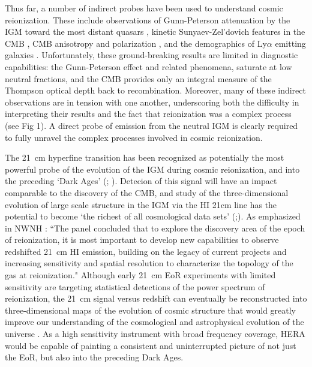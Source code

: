 \documentclass[preprint]{aastex}
\begin{document}
Thus far, a number of indirect probes have been used to understand cosmic reionization.  These include observations of Gunn-Peterson attenuation by the IGM toward the most distant quasars \citep{fan_et_al2006,bouwens_et_al2010}, kinetic
Sunyaev-Zel'dovich features in the CMB \citep{zahn_et_al2012}, CMB anisotropy and polarization \citep{page_et_al2007,planck_et_al2013}, and the demographics of Ly$\alpha$ emitting galaxies \citep{http://adsabs.harvard.edu/abs/2013arXiv1308.5985T}.  Unfortunately, these ground-breaking results are limited in diagnostic capabilities: the Gunn-Peterson effect and related phenomena, saturate at low neutral fractions, and the CMB provides only an integral measure of the Thompson optical depth back to recombination.  Moreover, many of these indirect observations are in tension with one another, underscoring both the difficulty in interpreting their results and the fact that reionization was a complex process (see Fig 1). A direct probe of emission from the neutral IGM is clearly required to fully unravel the complex processes involved in cosmic reionization. 

The 21~cm hyperfine transition has been recognized as potentially the most powerful probe of the evolution of the IGM during cosmic reionization, and into the preceding `Dark Ages' (\citealt{morales_wyithe2010}; \citealt{furlanetto_et_al2006}). Detecion of this signal will have an impact comparable to the discovery of the CMB, and study of the three-dimensional evolution of large scale structure in the IGM via the HI 21cm line has the potential to become `the richest of all cosmological data sets' (\citealt{barkana_loeb2005a};\citealt{loeb_zaldarriaga2004}).  As
emphasized in NWNH \citep{astro2010}: ``The panel concluded that to explore the
discovery area of the epoch of reionization, it is most important to develop
new capabilities to observe redshifted 21~cm HI emission, building on the
legacy of current projects and increasing sensitivity and spatial resolution to
characterize the topology of the gas at reionization."  Although early 21~cm EoR experiments with limited sensitivity are targeting
statistical detections of the power spectrum of reionization, the 21~cm signal
versus redshift can eventually be reconstructed into
three-dimensional maps of the evolution of cosmic structure that would greatly improve
our understanding of the cosmological and astrophysical evolution of the universe
\citep{furlanetto_et_al2006,mao_et_al2008,morales_wyithe2010}. As a high sensitivity instrument with broad frequency coverage, HERA would be capable of painting a consistent and uninterrupted picture of not just the EoR, but also into the preceding Dark Ages.  
\end{document}
